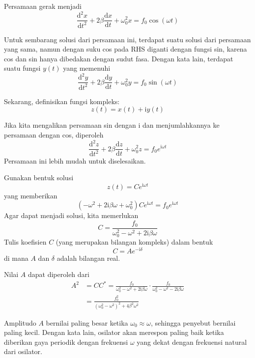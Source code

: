 Persamaan gerak menjadi 
\[
\frac{\mathrm{d}^{2}x}{\mathrm{d}t^{2}}+2\beta\frac{\mathrm{d}x}{\mathrm{d}t}+\omega_{0}^{2}x=f_{0}\cos(\omega t)
\]

Untuk sembarang solusi dari persamaan ini, terdapat suatu solusi dari
persamaan yang sama, namun dengan suku cos pada RHS diganti dengan
fungsi sin, karena cos dan sin hanya dibedakan dengan sudut fasa.
Dengan kata lain, terdapat suatu fungsi $y(t)$ yang memenuhi
\[
\frac{\mathrm{d}^{2}y}{\mathrm{d}t^{2}}+2\beta\frac{\mathrm{d}y}{\mathrm{d}t}+\omega_{0}^{2}y=f_{0}\sin(\omega t)
\]

Sekarang, definisikan fungsi kompleks:
\[
z(t)=x(t)+\mathrm{i}y(t)
\]

Jika kita mengalikan persamaan sin dengan $\mathrm{i}$ dan menjumlahkannya
ke persamaan dengan cos, diperoleh
\[
\frac{\mathrm{d}^{2}z}{\mathrm{d}t^{2}}+2\beta\frac{\mathrm{d}z}{\mathrm{d}t}+\omega_{0}^{2}z=f_{0}e^{\mathrm{i}\omega t}
\]
Persamaan ini lebih mudah untuk diselesaikan.

Gunakan bentuk solusi
\[
z(t)=Ce^{\mathrm{i}\omega t}
\]
yang memberikan
\[
(-\omega^{2}+2\mathrm{i}\beta\omega+\omega_{0}^{2})Ce^{\mathrm{i}\omega t}=f_{0}e^{\mathrm{i}\omega t}
\]
Agar dapat menjadi solusi, kita memerlukan
\[
C=\frac{f_{0}}{\omega_{0}^{2}-\omega^{2}+2\mathrm{i}\beta\omega}
\]
Tulis koefisien $C$ (yang merupakan bilangan kompleks) dalam bentuk
\[
C=Ae^{-\mathrm{i}\delta}
\]
di mana $A$ dan $\delta$ adalah bilangan real.

Nilai $A$ dapat diperoleh dari
\begin{align*}
A^{2} & =CC^{*}=\frac{f_{0}}{\omega_{0}^{2}-\omega^{2}+2\mathrm{i}\beta\omega}\cdot\frac{f_{0}}{\omega_{0}^{2}-\omega^{2}-2\mathrm{i}\beta\omega}\\
 & =\frac{f_{0}^{2}}{\left(\omega_{0}^{2}-\omega^{2}\right)^{2}+4\beta^{2}\omega^{2}}
\end{align*}

Amplitudo $A$ bernilai paling besar ketika $\omega_{0}\approx\omega$,
sehingga penyebut bernilai paling kecil. Dengan kata lain, osilator
akan merespon paling baik ketika diberikan gaya periodik dengan
frekuensi $\omega$ yang dekat dengan frekuensi natural dari osilator.







